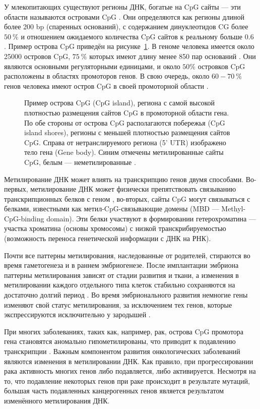 У млекопитающих существуют регионы ДНК, богатые на CpG сайты --- эти области называются островами CpG \autocite{Bird1986}. Они определяются как регионы длиной более 200 bp (спаренных оснований), с содержанием динуклеотидов CG более $50~\%$ и отношением ожидаемого количества CpG сайтов к реальному больше $0.6$ \autocite{GardinerGarden1987}. Пример острова CpG приведён на рисунке~\cref{fig:CpG_Island}. В геноме человека имеется около 25000 островов CpG, $75~\%$  которых имеют длину менее 850 пар оснований \autocite{Lander2001}. Они являются основными регуляторными единицами, и около $50\%$ островков CpG расположены в областях промоторов генов. В свою очередь, около $60-70~\%$ генов человека имеют остров CpG в своей промоторной области \autocite{Illingworth2010, Saxonov2006}.

\begin{figure}[ht]
	\caption{Пример острова CpG (CpG island), региона с самой высокой плотностью размещения сайтов CpG в промоторной области гена. По обе стороны от острова CpG располагаются побережья (CpG island shores), регионы с меньшей плотностью размещения сайтов CpG. Справа от нетранслируемого региона (5' UTR) изображено тело гена (Gene body). Синим отмечены метилированные сайты CpG, белым --- неметилированные \autocite{Fu2017}.}\label{fig:CpG_Island}
\end{figure}

Метилирование ДНК может влиять на транскрипцию генов двумя способами. Во-первых, метилирование ДНК может физически препятствовать связыванию транскрипционных белков с геном \autocite{Choy2010}, во-вторых, сайты CpG могут связываться с белками, известными как метил-CpG-связывающие домены (MBD --- Methyl-CpG-binding domain). Эти белки участвуют в формировании гетерохроматина --- участка хроматина (основы хромосомы) с низкой транскрибируемостью (возможность переноса генетической информации с ДНК на РНК). 

Почти все паттерны метилирования, наследованные от родителей, стираются во время гаметогенеза и в раннем эмбриогенезе. После имплантации эмбриона паттерны метилирования зависят от стадии развития и ткани, а изменения в метилировании каждого отдельного типа клеток стабильно сохраняются на достаточно долгий период \autocite{Cedar2012}. Во время эмбрионального развития немногие гены изменяют свой статус метилирования, за исключением тех генов, которые экспрессируются исключительно у зародышей \autocite{Borgel2010}.

При многих заболеваниях, таких как, например, рак, острова CpG промотора гена становятся аномально гипометилированы, что приводит к подавлению транскрипции \autocite{Wang2018}. Важным компонентом развития онкологических заболеваний являются изменения в метилировании ДНК. Как правило, при прогрессировании рака активность многих генов либо подавляется, либо активируется. Несмотря на то, что подавление некоторых генов при раке происходит в результате мутаций, большая часть подавленных канцерогенных генов является результатом изменённого метилирования ДНК. 

